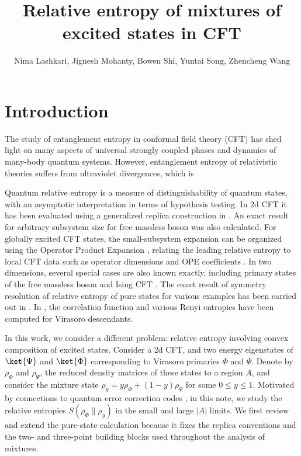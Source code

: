 \documentclass[11pt]{article}
\title{Relative entropy of mixtures of excited states in CFT}
\author{Nima Lashkari, Jignesh Mohanty, Bowen Shi, Yuntai Song, Zhencheng Wang}
\affiliation{Department of Physics, Purdue University, West Lafayette, IN 47907, USA}
\begin{document}
\maketitle
\flushbottom
  \section{Introduction}

The study of entanglement entropy in conformal field theory (CFT) has shed light on many aspects of universal strongly coupled phases and dynamics of many-body quantum systems. However, entanglement entropy of relativistic theories suffers from ultraviolet divergences, which is 

Quantum relative entropy is a measure of distinguishability of quantum states, with an asymptotic interpretation in terms of hypothesis testing. In 2d CFT it has been evaluated using a generalized replica construction in \cite{Lashkari_2014,Lashkari_2016}. An exact result for arbitrary subsystem size for free massless boson was also calculated. For globally excited CFT states, the small-subsystem expansion can be organized using the Operator Product Expansion \cite{yellowbook}, relating the leading relative entropy to local CFT data such as operator dimensions and OPE coefficients \cite{S_rosi_2016,S_rosi_2018}. In two dimensions, several special cases are also known exactly, including primary states of the free massless boson and Ising CFT \cite{Ruggiero_2017, Nakagawa_2017}. The exact result of symmetry resolution of relative entropy of pure states for
various examples has been carried out in \cite{Chen_2021}.
In \cite{Chowdhury_2022,Brehm_2021}, the correlation function and various Renyi entropies have been computed for Virasoro descendants. 

  In this work, we consider a different problem: relative entropy involving convex composition of excited states.
  Consider a 2d CFT, and two energy eigenstates of $\ket{\Psi}$ and
  $\ket{\Phi}$ corresponding to Virasoro primaries $\Phi$ and
  $\Psi$. Denote by $\rho_\Phi$ and $\rho_\Psi$, the reduced density matrices of these states to a region $A$, and consider the mixture state $\rho_y=y\rho_\Phi+(1-y)\rho_\Psi$ for some $0\leq y\leq 1$. Motivated by connections to quantum error correction codes \cite{song2026approximatequantumerrorcorrection}, in this note, we study the relative entropies $S(\rho_\Phi\|\rho_y)$ in the small and large $|A|$ limits. We first review and extend the pure-state calculation because it fixes the replica conventions and the two- and three-point building blocks used throughout the analysis of mixtures.
\end{document}
